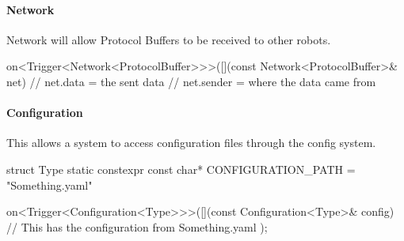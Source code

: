 \documentclass[a4paper]{article}
\begin{document}
	\paragraph{Network} Network will allow Protocol Buffers to be received to other robots.\\
	\begin{cppcode}
		on<Trigger<Network<ProtocolBuffer>>>([](const Network<ProtocolBuffer>& net) {
			// net.data = the sent data
			// net.sender = where the data came from
		}
	\end{cppcode}

	\paragraph{Configuration} This allows a system to access configuration files through the config system.\\
	\begin{cppcode}
		struct Type {
			static constexpr const char* CONFIGURATION_PATH = "Something.yaml"
		}

		on<Trigger<Configuration<Type>>>([](const Configuration<Type>& config) {
			// This has the configuration from Something.yaml
		});
	\end{cppcode}
\end{document}
